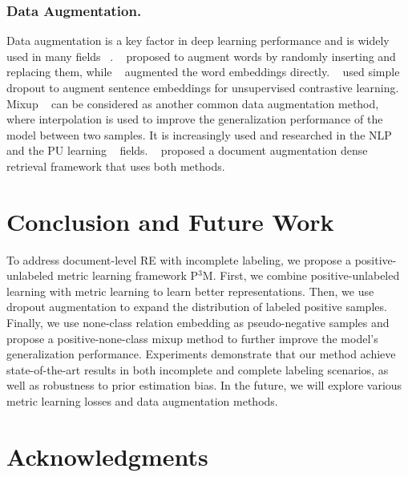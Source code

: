\documentclass[letterpaper]{article}
\begin{document}
\subsubsection{Data Augmentation.}
Data augmentation is a key factor in deep learning performance and is widely used in many fields ~\cite{DBLP:journals/jbd/ShortenK19,DBLP:conf/naacl/HedderichLASK21}. ~\cite{DBLP:conf/emnlp/WeiZ19,ma2019nlpaug} proposed to augment words by randomly inserting and replacing them, while ~\cite{DBLP:conf/acl/LeeKLH20} augmented the word embeddings directly. ~\cite{DBLP:conf/emnlp/GaoYC21} used simple dropout to augment sentence embeddings for unsupervised contrastive learning. Mixup ~\cite{DBLP:conf/iclr/ZhangCDL18,DBLP:conf/icml/VermaLBNMLB19} can be considered as another common data augmentation method, where interpolation is used to improve the generalization performance of the model between two samples. It is increasingly used and researched in the NLP ~\cite{DBLP:conf/acl/ChenYY20,DBLP:conf/acl/YinWQX21,DBLP:conf/naacl/WuX0ZMXZ22} and the PU learning ~\cite{DBLP:conf/nips/ChenLWZW20,DBLP:journals/corr/abs-2004-09388,DBLP:conf/iclr/LiLFO22,DBLP:conf/cvpr/ZhaoXJWH22} fields. ~\cite{DBLP:conf/acl/JeongBCHP22} proposed a document augmentation dense retrieval framework that uses both methods.

\section{Conclusion and Future Work}

To address document-level RE with incomplete labeling, we propose a positive-unlabeled metric learning framework P$^{3}$M. First, we combine positive-unlabeled learning with metric learning to learn better representations. Then, we use dropout augmentation to expand the distribution of labeled positive samples. Finally, we use none-class relation embedding as pseudo-negative samples and propose a positive-none-class mixup method to further improve the model's generalization performance. Experiments demonstrate that our method achieve state-of-the-art results in both incomplete and complete labeling scenarios, as well as robustness to prior estimation bias. In the future, we will explore various metric learning losses and data augmentation methods.

\section{Acknowledgments}
\end{document}
